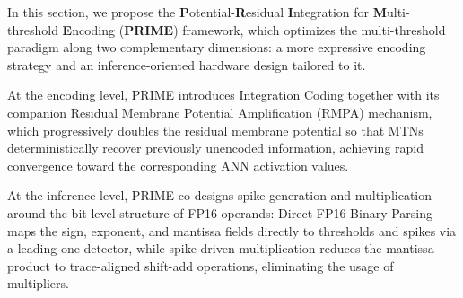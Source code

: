 


In this section, we propose the \textbf{P}otential-\textbf{R}esidual \textbf{I}ntegration for \textbf{M}ulti-threshold \textbf{E}ncoding (\textbf{PRIME}) framework, which optimizes the multi-threshold paradigm along two complementary dimensions: a more expressive encoding strategy and an inference-oriented hardware design tailored to it.

At the encoding level, PRIME introduces Integration Coding together with its companion Residual Membrane Potential Amplification (RMPA) mechanism, which progressively doubles the residual membrane potential so that MTNs deterministically recover previously unencoded information, achieving rapid convergence toward the corresponding ANN activation values.

At the inference level, PRIME co-designs spike generation and multiplication around the bit-level structure of FP16 operands: Direct FP16 Binary Parsing maps the sign, exponent, and mantissa fields directly to thresholds and spikes via a leading-one detector, while spike-driven multiplication reduces the mantissa product to trace-aligned shift-add operations, eliminating the usage of multipliers.

